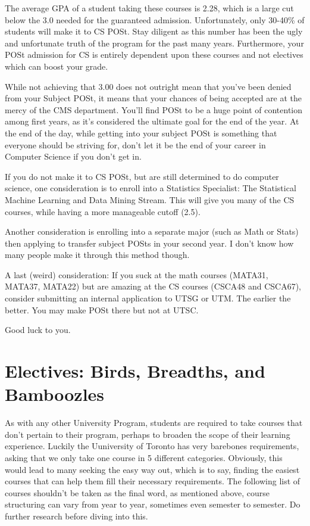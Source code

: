 \documentclass[11pt]{article}
\begin{document}
The average GPA of a student taking these courses is 2.28, which is a large cut below the 3.0 needed for the guaranteed admission. Unfortunately, only 30-40\% of students will make it to CS POSt. Stay diligent as this number has been the ugly and unfortunate truth of the program for the past many years. Furthermore, your POSt admission for CS is entirely dependent upon these courses and not electives which can boost your grade.\par
While not achieving that 3.00 does not outright mean that you've been denied from your Subject POSt, it means that your chances of being accepted are at the mercy of the CMS department.  You'll find POSt to be a huge point of contention among first years, as it's considered the ultimate goal for the end of the year. At the end of the day, while getting into your subject POSt is something that everyone should be striving for, don't let it be the end of your career in Computer Science if you don't get in.\par
If you do not make it to CS POSt, but are still determined to do computer science, one consideration is to enroll into a Statistics Specialist: The Statistical Machine Learning and Data Mining Stream. This will give you many of the CS courses, while having a more manageable cutoff (2.5).\par
Another consideration is enrolling into a separate major (such as Math or Stats) then applying to transfer subject POSts in your second year. I don't know how many people make it through this method though.\par
A last (weird) consideration: If you suck at the math courses (MATA31, MATA37, MATA22) but are amazing at the CS courses (CSCA48 and CSCA67), consider submitting an internal application to UTSG or UTM. The earlier the better. You may make POSt there but not at UTSC.\par
Good luck to you.


\section{Electives: Birds, Breadths, and Bamboozles}
As with any other University Program, students are required to take courses that don't pertain to their program, perhaps to broaden the scope of their learning experience. Luckily the Uuniversity of Toronto has very barebones requirements, asking that we only take one course in 5 different categories. Obviously, this would lead to many seeking the easy way out, which is to say, finding the easiest courses that can help them fill their necessary requirements.  The following list of courses shouldn't be taken as the final word, as mentioned above, course structuring can vary from year to year, sometimes even semester to semester.  Do further research before diving into this.
\end{document}
